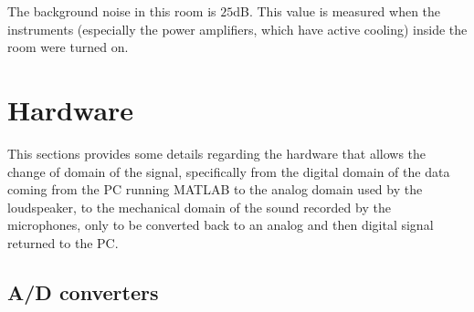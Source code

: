 The background noise in this room is \tld$25$dB. This value is measured when the instruments (especially the power amplifiers, which have active cooling) inside the room were turned on.

\section{Hardware}
\label{sec:hw}

This sections provides some details regarding the hardware that allows the change of domain of the signal, specifically from the digital domain of the data coming from the PC running MATLAB to the analog domain used by the loudspeaker, to the mechanical domain of the sound recorded by the microphones, only to be converted back to an analog and then digital signal returned to the PC.

\subsection{A/D converters}{}

